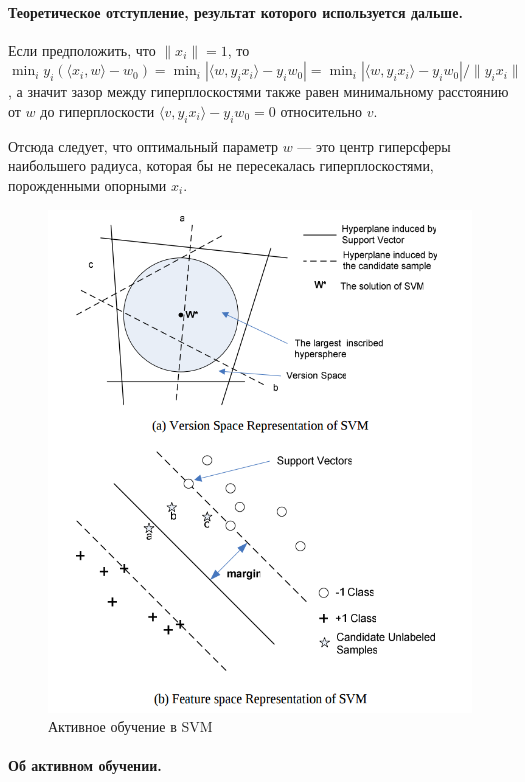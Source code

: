 \documentclass[specialist, 12pt, href]{article}
\begin{document}
\paragraph{Теоретическое отступление, результат которого используется
дальше.}

Если предположить, что \(\|x_i\| = 1\), то
\(\min_i y_i(\langle x_i, w \rangle - w_0) = \min_i |\langle w, y_i x_i\rangle - y_i w_0| = \min_i |\langle w, y_i x_i\rangle - y_i w_0|/\|y_ix_i\|\),
а значит зазор между гиперплоскостями также равен минимальному
расстоянию от \(w\) до гиперплоскости
\(\langle v, y_i x_i\rangle - y_i w_0 = 0\) относительно \(v\).

Отсюда следует, что оптимальный параметр \(w\) --- это центр гиперсферы
наибольшего радиуса, которая бы не пересекалась гиперплоскостями, порожденными опорными \(x_i\).

\begin{figure}[htbp]
\centering
\includegraphics[width=5in]{img/svm+al.png}
\caption{Активное обучение в SVM}
\end{figure}

\paragraph{Об активном
обучении.}
\end{document}
